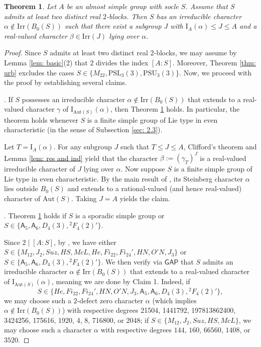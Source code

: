 \documentclass[10pt]{article}
\newtheorem{thm}[lem]{\bf Theorem}
\begin{document}
\begin{thm}\label{thm: almost simple}
   Let $A$ be an almost simple group with socle $S$.
   Assume that $S$ admits at least two distinct real $2$-blocks.
   Then 
   $S$ has an irreducible character $\alpha\notin \mathrm{Irr}(B_0(S))$ 
   such that there exist a subgroup $J$ with $\mathrm{I}_{A}(\alpha)\leq J\leq A$ and a real-valued character $\beta\in \mathrm{Irr}(J)$ lying over $\alpha$.
\end{thm}
\begin{proof}
  Since $S$ admits at least two distinct real $2$-blocks, we may assume by Lemma \ref{lem: basic}(2) that $2$ divides the index $[A:S]$.
  Moreover, Theorem \ref{thm: urb} excludes the cases $S\in \{ M_{22}, \mathrm{PSL}_3(3), \mathrm{PSU}_3(3) \}$. 
  Now, we proceed with the proof by establishing several claims.

 

  . If $S$ possesses an irreducible character $\alpha\notin \mathrm{Irr}(B_0(S))$
that extends to a real-valued character $\gamma$ of $\mathrm{I}_{\mathrm{Aut}(S)}(\alpha)$,
then Theorem \ref{thm: almost simple} holds. 
In particular, the theorem holds whenever $S$ is a finite simple group of Lie type in even characteristic (in the sense of Subsection \ref{sec: 2.3}).


Let $T = \mathrm{I}_{A}(\alpha)$. 
For any subgroup $J$ such that $T\leq J\leq A$, Clifford's theorem and Lemma \ref{lem: res and ind} yield that the character $\beta:=(\gamma_T)^{J}$ is a real-valued irreducible character of $J$ lying over $\alpha$.
Now suppose $S$ is a finite simple group of Lie type in even characteristic.
By the main result of \cite{feit93}, its Steinberg character $\alpha$ lies outside $B_0(S)$
and extends to a rational-valued (and hence real-valued) character of $\mathrm{Aut}(S)$. 
Taking $J=A$ yields the claim.










. Theorem \ref{thm: almost simple} holds if $S$ is a sporadic simple group or $S \in \{ \mathsf{A}_5, \mathsf{A}_6,D_4(3),{}^{2}\!F_4(2)' \} $.
 

 Since $2\mid [A:S]$, by \cite{atlas},
 we have either $S\in \{ M_{12}, J_2, Suz, HS, McL, He, Fi_{22}, Fi_{24}', HN, O'N, J_3 \}$ 
 or $S \in \{ \mathsf{A}_5, \mathsf{A}_6,D_4(3),{}^{2}\!F_4(2)' \} $.
 We then verify via $\mathsf{GAP}$ \cite{gap} that $S$ admits an irreducible character $\alpha\notin \mathrm{Irr}(B_0(S))$
 that extends to a real-valued character of $\mathrm{I}_{\mathrm{Aut}(S)}(\alpha)$, meaning we are done by Claim 1.
 Indeed, if 
 $$S\in \{ He, Fi_{22}, Fi_{24}', HN, O'N, J_3, \mathsf{A}_5, \mathsf{A}_6, D_4(3),{}^{2}\!F_4(2)' \},$$
 we may choose such a $2$-defect zero character $\alpha$ (which implies $\alpha\notin \mathrm{Irr}(B_0(S))$) with respective degrees 21504, 1441792, 197813862400, 3424256, 175616, 1920, 4, 8, 716800, or 2048;
 if $S\in \{ M_{12}, J_2, Suz, HS, McL \}$,
 we may choose such a character $\alpha$ with respective degrees $144$, $160$, $66560$, $1408$, or $3520$.


\end{proof}
\end{document}
